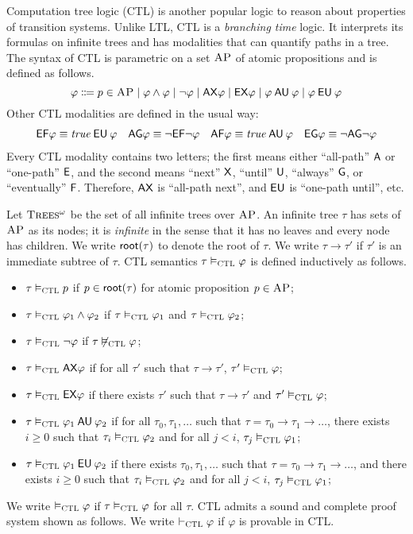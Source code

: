 \documentclass{amsart}
\begin{document}
Computation tree logic (CTL) is another popular logic
to reason about properties of transition systems.
Unlike LTL, CTL is a \emph{branching time} logic.
It interprets its formulas on infinite trees
and has modalities that can quantify paths in a tree.
The syntax of CTL is parametric on a set $\textsc{AP}$ of atomic propositions and
is defined as follows.
$$
\varphi \Coloneqq p \in \textsc{AP} \mid
\varphi \wedge \varphi \mid
\neg \varphi \mid
\mathsf{AX} \varphi \mid
\mathsf{EX} \varphi \mid
\varphi \mathbin{\mathsf{AU}} \varphi \mid
\varphi \mathbin{\mathsf{EU}} \varphi
$$
Other CTL modalities are defined in the usual way:
\begin{align*}
{\mathsf{EF}} \varphi \equiv \mathit{true} \mathbin{\mathsf{EU}} \varphi &&
{\mathsf{AG}} \varphi \equiv \neg {\mathsf{EF}} \neg \varphi &&
{\mathsf{AF}} \varphi \equiv \mathit{true} \mathbin{\mathsf{AU}} \varphi &&
{\mathsf{EG}} \varphi \equiv \neg {\mathsf{AG}} \neg \varphi
\end{align*}
Every CTL modality contains two letters;
the first means either ``all-path'' ${\mathsf{A}}$ or ``one-path'' ${\mathsf{E}}$,
and the second means ``next'' ${\mathsf{X}}$, ``until'' $\mathbin{\mathsf{U}}$, ``always'' ${\mathsf{G}}$,
or ``eventually'' ${\mathsf{F}}$.
Therefore, $\mathsf{AX}$ is ``all-path next'', and $\mathbin{\mathsf{EU}}$ is ``one-path until'', etc.

Let $\textsc{Trees$^\omega$}$ be the set of all infinite trees over $\textsc{AP}$.
An infinite tree $\tau$ has sets of $\textsc{AP}$ as its nodes;
it is \emph{infinite} in the sense that it has no leaves
and every node has children.
We write $\mathsf{root}(\tau)$ to denote the root of $\tau$.
We write $\tau \to \tau'$ 
if $\tau'$ is an immediate subtree of $\tau$.
CTL semantics $\tau \vDash_{\textsc{CTL}} \varphi$ is defined inductively as follows.
\begin{itemize}
	\item $\tau \vDash_{\textsc{CTL}} p$ if $p \in \mathsf{root}(\tau)$ for atomic proposition $p \in
	\textsc{AP}$;
	\item $\tau \vDash_{\textsc{CTL}} \varphi_1 \wedge \varphi_2$ if
	$\tau \vDash_{\textsc{CTL}} \varphi_1$ and $\tau \vDash_{\textsc{CTL}} \varphi_2$;
	\item $\tau \vDash_{\textsc{CTL}} \neg \varphi$ if
	$\tau \not\vDash_{\textsc{CTL}} \varphi$;
	\item $\tau \vDash_{\textsc{CTL}} \mathsf{AX} \varphi$ if
	for all $\tau'$ such that $\tau \to \tau'$, $\tau' \vDash_{\textsc{CTL}} \varphi$;
	\item $\tau \vDash_{\textsc{CTL}} \mathsf{EX} \varphi$ if
	there exists $\tau'$ such that $\tau \to \tau'$ and $\tau' \vDash_{\textsc{CTL}} \varphi$;\item $\tau \vDash_{\textsc{CTL}} \varphi_1 \mathbin{\mathsf{AU}} \varphi_2$ if
	for all $\tau_0,\tau_1,\dots$ such that
	$\tau = \tau_0 \to \tau_1 \to \dots$,
	there exists $i \ge 0$ such that
	$\tau_i \vDash_{\textsc{CTL}} \varphi_2$
	and for all $j < i$, $\tau_j \vDash_{\textsc{CTL}} \varphi_1$;
	\item $\tau \vDash_{\textsc{CTL}} \varphi_1 \mathbin{\mathsf{EU}} \varphi_2$ if
	there exists $\tau_0,\tau_1,\dots$ such that
	$\tau = \tau_0 \to \tau_1 \to \dots$, and
	there exists $i \ge 0$ such that
	$\tau_i \vDash_{\textsc{CTL}} \varphi_2$
	and for all $j < i$, $\tau_j \vDash_{\textsc{CTL}} \varphi_1$;
\end{itemize}
We write $\vDash_{\textsc{CTL}} \varphi$ if $\tau \vDash_{\textsc{CTL}}\varphi$ for all $\tau$.
CTL admits a sound and complete proof system shown as follows.
We write $\vdash_{\textsc{CTL}}\varphi$ if $\varphi$ is provable in CTL.
\end{document}
